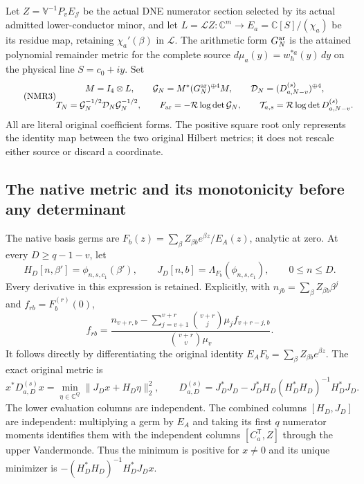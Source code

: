 Let $Z=\mathbb V^{-1}P_vE_{\mathcal J}$ be the actual DNE numerator
section selected by its actual admitted lower-conductor minor, and let
$L=\mathcal LZ:\mathbb C^m\to E_a=\mathbb C[S]/(\chi_a)$ be its
residue map, retaining $\chi_a'(\beta)$ in $\mathcal L$.
The arithmetic form $G_N^{\rm ar}$ is the attained polynomial
remainder metric for the complete source
$d\mu_a(y)=w_h^{*a}(y)\,dy$ on the physical line $S=c_0+iy$.
Set
\begin{equation}\tag{NMR3}\label{a03cm:nmr:forms}
\begin{gathered}
M=I_4\otimes L,\qquad
\mathcal G_N=M^*(G_N^{\rm ar})^{\oplus4}M,\qquad
\mathcal D_N=(D_{a,N-v}^{(s)})^{\oplus4},\\
T_N=\mathcal G_N^{-1/2}\mathcal D_N\mathcal G_N^{-1/2},\qquad
F_{\rm ar}=-\mathcal R\log\det\mathcal G_N,\qquad
\mathcal T_{a,s}=\mathcal R\log\det D_{a,N-v}^{(s)} .
\end{gathered}
\end{equation}
All are literal original coefficient forms. The positive square root
only represents the identity map between the two original Hilbert
metrics; it does not rescale either source or discard a coordinate.

\subsection{The native metric and its monotonicity before any determinant}
The native basis germs are
$F_b(z)=\sum_\beta Z_{\beta b}e^{\beta z}/E_A(z)$, analytic at zero.
At every $D\geq q-1-v$, let
\[
H_D[n,\beta']=\phi_{n,s,c_1}(\beta'),\qquad
J_D[n,b]=\Lambda_{F_b}(\phi_{n,s,c_1}),
\qquad0\leq n\leq D.
\]
Every derivative in this expression is retained. Explicitly,
with $n_{jb}=\sum_\beta Z_{\beta b}\beta^j$ and $f_{rb}=F_b^{(r)}(0)$,
\[
f_{rb}=
\frac{n_{v+r,b}-\sum_{j=v+1}^{v+r}
             \binom{v+r}{j}\mu_j f_{v+r-j,b}}
     {\binom{v+r}{v}\mu_v}.
\]
It follows directly by differentiating the original identity
$E_AF_b=\sum_\beta Z_{\beta b}e^{\beta z}$.
The exact original metric is
\begin{equation}\tag{NMR4}\label{a03cm:nmr:native-min}
x^*D_{a,D}^{(s)}x
 =\min_{\eta\in\mathbb C^Q}\|J_Dx+H_D\eta\|_2^2,\qquad
D_{a,D}^{(s)}
 =J_D^*J_D-J_D^*H_D(H_D^*H_D)^{-1}H_D^*J_D .
\end{equation}
The lower evaluation columns are independent. The combined columns
$[H_D,J_D]$ are independent: multiplying a germ by $E_A$ and taking
its first $q$ numerator moments identifies them with the independent
columns $[C_a^{\mathsf T},Z]$ through the upper Vandermonde.
Thus the minimum is positive for $x\ne0$ and its unique minimizer is
$-(H_D^*H_D)^{-1}H_D^*J_Dx$.

